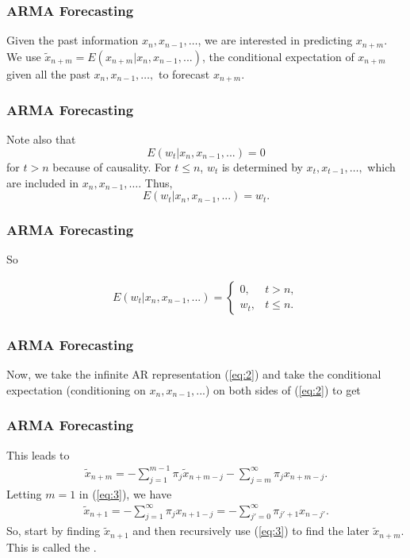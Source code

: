 \documentclass[%
xcolor=pdftex]{beamer}
\begin{document}
\begin{frame}
\frametitle{ARMA Forecasting}

Given the past information $x_{n},x_{n-1},\ldots$, we are
interested in predicting $x_{n+m}$. We use $\widetilde{x}_{n+m}=E(x_{n+m}|x_n,x_{n-1},...) $,
the conditional expectation of $x_{n+m}$ given all the past
$x_n,x_{n-1},\ldots,$ to forecast $x_{n+m}$.

\end{frame}

\begin{frame}
\frametitle{ARMA Forecasting}

Note also that
$$
E(w_t|x_n,x_{n-1},...)=0
$$
for $t>n$  because of causality. For $t \leq n$, $w_t$ is
determined by $x_t,x_{t-1},\ldots,$ which are included in
$x_n,x_{n-1},\ldots$. Thus,
$$
E(w_t|x_n,x_{n-1},...)=w_t.
$$

\end{frame}

\begin{frame}
\frametitle{ARMA Forecasting}

So

\begin{eqnarray}\label{eq:causal_white}
E(w_t|x_n,x_{n-1},...) = \left \{ \begin{array}{ll}
0, & t > n, \\
w_t, & t \leq n.
\end{array} \right.
\end{eqnarray}

\end{frame}


\begin{frame}
\frametitle{ARMA Forecasting}

Now, we take the infinite AR representation (\ref{eq:2}) and
take the conditional expectation (conditioning on $x_n,
x_{n-1},...$) on both sides of (\ref{eq:2}) to get

\vspace{40mm}

\end{frame}

\begin{frame}
\frametitle{ARMA Forecasting}

This leads to
\begin{eqnarray}\label{eq:3}
\widetilde{x}_{n+m} =- \sum_{j=1}^{m-1} \pi_j \widetilde{x}_{n+m-j}-\sum_{j=m}^\infty \pi_j x_{n+m-j}.
\end{eqnarray}
Letting $m=1$ in (\ref{eq:3}), we have
\begin{eqnarray*}
\widetilde{x}_{n+1} = -\sum^\infty_{j=1} \pi_j x_{n+1-j} = - \sum^\infty_{j'=0} \pi_{j'+1} x_{n-j'}.
\end{eqnarray*}
So, start by finding $\widetilde{x}_{n+1}$ and then recursively use
(\ref{eq:3}) to find the later $\widetilde{x}_{n+m}$. This is called the \underline{\hspace{35 mm}}.

\end{frame}
\end{document}
